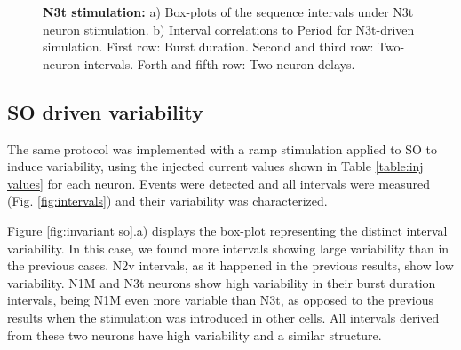 \begin{figure}[hbt!]
\begin{minipage}[b]{0.53\textwidth}
\begin{minipage}[b]{\textwidth}
		\end{minipage}
	\end{minipage}
	\caption{\textbf{N3t stimulation:} a) Box-plots of the sequence intervals under N3t neuron stimulation. b) Interval correlations to Period for N3t-driven simulation. First row: Burst duration. Second and third row: Two-neuron intervals. Forth and fifth row: Two-neuron delays.}
	\label{fig:invariants n3t}
\end{figure}





\subsection{SO driven variability}
\label{subsec:so driven}

The same protocol was implemented with a ramp stimulation applied to SO to induce variability, using the injected current values shown in Table \ref{table:inj values} for each neuron. Events were detected and all intervals were measured (Fig. \ref{fig:intervals}) and their variability was characterized. %

Figure \ref{fig:invariant so}.a) displays the box-plot representing the distinct interval variability. In this case, we found more intervals showing large variability than in the previous cases. N2v intervals, as it happened in the previous results, show low variability. %
N1M and N3t neurons show high variability in their burst duration intervals, being N1M even more variable than N3t, as opposed to the previous results when the stimulation was introduced in other cells. All intervals derived from these two neurons have high variability and a similar structure. %




